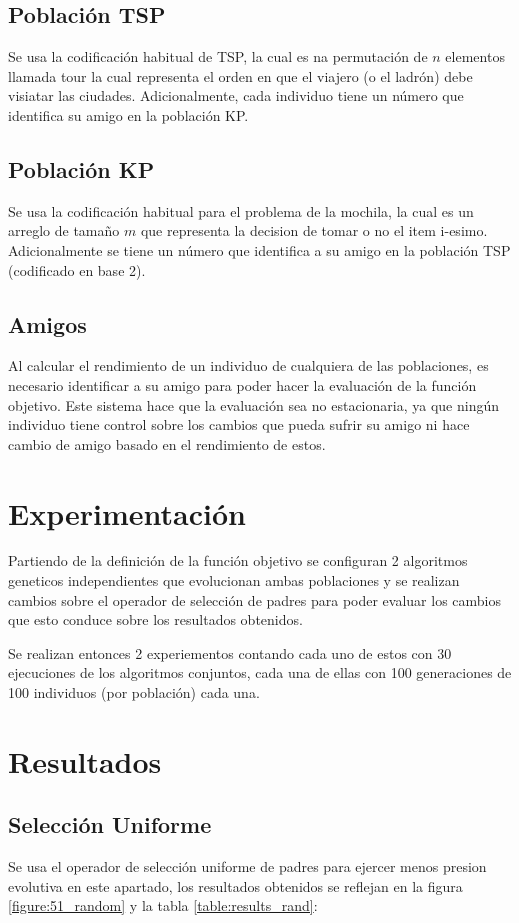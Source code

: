 \documentclass[twocolumn]{IEEEtran}
\begin{document}
\subsection{Población TSP}
Se usa la codificación habitual de TSP, la cual es na permutación de $n$ elementos llamada tour
la cual representa el orden en que el viajero (o el ladrón) debe visiatar las ciudades.
Adicionalmente, cada individuo tiene un número que identifica su amigo en la población KP.

\subsection{Población KP}
Se usa la codificación habitual para el problema de la mochila, la cual es un 
arreglo de tamaño $m$ que representa la decision de tomar o no el item i-esimo.
Adicionalmente se tiene un número que identifica a su amigo en la población TSP (codificado en base 2).

\subsection*{Amigos}
Al calcular el rendimiento de un individuo de cualquiera de las poblaciones, es necesario identificar
a su amigo para poder hacer la evaluación de la función objetivo.
Este sistema hace que la evaluación sea no estacionaria, ya que ningún individuo tiene control
sobre los cambios que pueda sufrir su amigo ni hace cambio de amigo basado en el rendimiento de estos.

\section{Experimentación}
Partiendo de la definición de la función objetivo se configuran 2 algoritmos geneticos
independientes que evolucionan ambas poblaciones y se realizan cambios sobre el operador de
selección de padres para poder evaluar los cambios que esto conduce sobre los resultados obtenidos.

Se realizan entonces 2 experiementos contando cada uno de estos con 30 ejecuciones de los
algoritmos conjuntos, cada una de ellas con 100 generaciones de 100 individuos
(por población) cada una.

\section{Resultados}

\subsection{Selección Uniforme}
Se usa el operador de selección uniforme de padres para ejercer menos presion evolutiva
en este apartado, los resultados obtenidos se reflejan en la figura \ref{figure:51_random}
y la tabla \ref{table:results_rand}:
\end{document}

